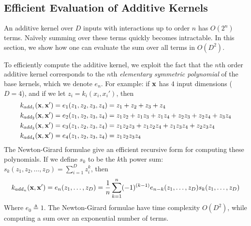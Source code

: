 

\subsection{Efficient Evaluation of Additive Kernels}
An additive kernel over $D$ inputs with interactions up to order $n$ has $O(2^n)$ terms.
Na\"{i}vely summing over these terms quickly becomes intractable.
In this section, we show how one can evaluate the sum over all terms in $O(D^2)$.

To efficiently compute the additive kernel, we exploit the fact that the $n$th order additive kernel corresponds to the $n$th \textit{elementary symmetric polynomial} \citep{macdonald1998symmetric}
of the base kernels, which we denote $e_n$.
For example:  if $\bf x$ has 4 input dimensions ($D = 4$), and if we let $z_i = k_i(x_i,x_i')$, then
%
\begin{align}
k_{add_1}({\bf x, x'}) & = e_1( z_1, z_2, z_3, z_4 ) = z_1 + z_2 + z_3 + z_4 \\
k_{add_2}({\bf x, x'}) & = e_2( z_1, z_2, z_3, z_4 ) = z_1 z_2 + z_1 z_3 + z_1z_4 + z_2 z_3 + z_2 z_4 + z_3 z_4 \\
k_{add_3}({\bf x, x'}) & = e_3( z_1, z_2, z_3, z_4 ) = z_1 z_2 z_3 + z_1 z_2 z_4 + z_1 z_3 z_4 + z_2 z_3 z_4 \\
k_{add_4}({\bf x, x'}) & = e_4( z_1, z_2, z_3, z_4 ) = z_1 z_2 z_3 z_4
\end{align}
%
The Newton-Girard formulae give an efficient recursive form for computing these polynomials.
If we define $s_k$ to be the $k$th power sum: $s_k(z_1,z_2,\dots,z_D) = \sum_{i=1}^Dz_i^k$, then
%
\begin{align}
k_{add_n}({\bf x, x'}) = e_n(z_1,\dots,z_D) = \frac{1}{n} \sum_{k=1}^n (-1)^{(k-1)} e_{n-k}(z_1,\dots,z_D)s_k(z_1,\dots,z_D)
\end{align}
%
Where $e_0 \triangleq 1$.  The Newton-Girard formulae have time complexity $O( D^2 )$, while computing a sum over an exponential number of terms.

